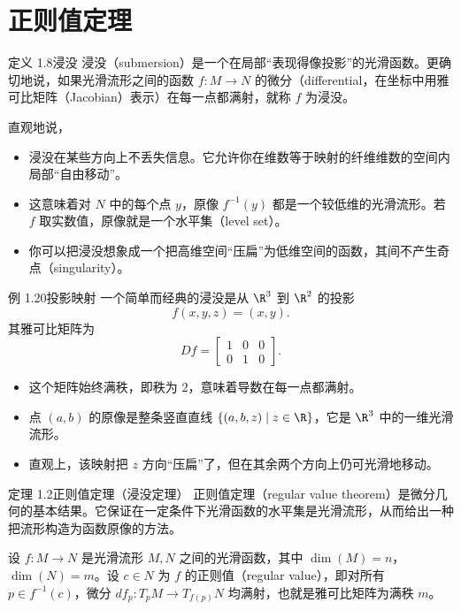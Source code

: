 \section{正则值定理}
\begin{statement}{定义 1.8}{浸没}
浸没（submersion）是一个在局部“表现得像投影”的光滑函数。更确切地说，如果光滑流形之间的函数 $f\colon M\to N$ 的微分（differential，在坐标中用雅可比矩阵（Jacobian）表示）在每一点都满射，就称 $f$ 为浸没。

直观地说，
\begin{itemize}
  \item 浸没在某些方向上不丢失信息。它允许你在维数等于映射的纤维维数的空间内局部“自由移动”。
  \item 这意味着对 $N$ 中的每个点 $y$，原像 $f^{-1}(y)$ 都是一个较低维的光滑流形。若 $f$ 取实数值，原像就是一个水平集（level set）。
  \item 你可以把浸没想象成一个把高维空间“压扁”为低维空间的函数，其间不产生奇点（singularity）。
\end{itemize}
\end{statement}

\begin{statement}{例 1.20}{投影映射}
一个简单而经典的浸没是从 $\R^3$ 到 $\R^2$ 的投影
\[
  f(x,y,z)=(x,y).
\]
其雅可比矩阵为
\[
  Df=\begin{bmatrix}
    1 & 0 & 0\\
    0 & 1 & 0
  \end{bmatrix}.
\]
\begin{itemize}
  \item 这个矩阵始终满秩，即秩为 $2$，意味着导数在每一点都满射。
  \item 点 $(a,b)$ 的原像是整条竖直直线 $\{(a,b,z)\mid z\in\R\}$，它是 $\R^3$ 中的一维光滑流形。
  \item 直观上，该映射把 $z$ 方向“压扁”了，但在其余两个方向上仍可光滑地移动。
\end{itemize}
\end{statement}

\begin{statement}{定理 1.2}{正则值定理（浸没定理）}
正则值定理（regular value theorem）是微分几何的基本结果。它保证在一定条件下光滑函数的水平集是光滑流形，从而给出一种把流形构造为函数原像的方法。
\end{statement}

设 $f\colon M\to N$ 是光滑流形 $M,N$ 之间的光滑函数，其中 $\dim(M)=n$，$\dim(N)=m$。设 $c\in N$ 为 $f$ 的正则值（regular value），即对所有 $p\in f^{-1}(c)$，微分 $df_p\colon T_pM\to T_{f(p)}N$ 均满射，也就是雅可比矩阵为满秩 $m$。

